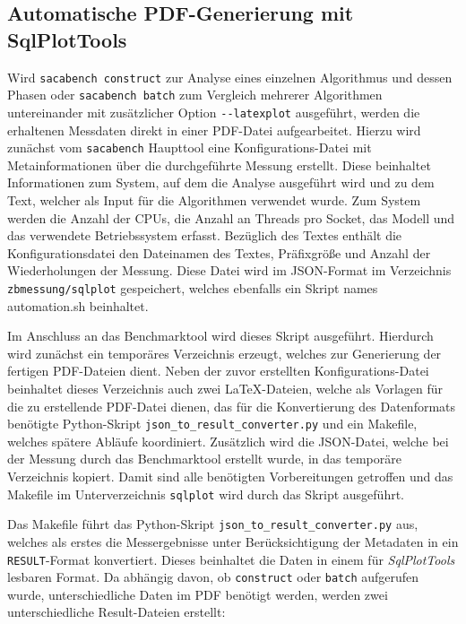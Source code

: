 \subsection{Automatische PDF-Generierung mit SqlPlotTools}
\label{framework:bechmark:sqlplottools}

Wird \texttt{sacabench construct} zur Analyse eines einzelnen Algorithmus und dessen Phasen oder \texttt{sacabench batch} zum Vergleich mehrerer Algorithmen untereinander mit zusätzlicher Option \texttt{-{}-latexplot} ausgeführt, werden die erhaltenen Messdaten direkt in einer PDF-Datei aufgearbeitet.
Hierzu wird zunächst vom \texttt{sacabench} Haupttool eine Konfigurations-Datei mit Metainformationen über die durchgeführte Messung erstellt.
Diese beinhaltet Informationen zum System, auf dem die Analyse ausgeführt wird und zu dem Text, welcher als Input für die Algorithmen verwendet wurde.
Zum System werden die Anzahl der CPUs, die Anzahl an Threads pro Socket, das Modell und das verwendete Betriebssystem erfasst.
Bezüglich des Textes enthält die Konfigurationsdatei den Dateinamen des Textes, Präfixgröße und Anzahl der Wiederholungen der Messung.
Diese Datei wird im JSON-Format im Verzeichnis \texttt{zbmessung/sqlplot} gespeichert, welches ebenfalls ein Skript names automation.sh beinhaltet.\par
Im Anschluss an das Benchmarktool wird dieses Skript ausgeführt.
Hierdurch wird zunächst ein temporäres Verzeichnis erzeugt, welches zur Generierung der fertigen PDF-Dateien dient.
Neben der zuvor erstellten Konfigurations-Datei beinhaltet dieses Verzeichnis auch zwei LaTeX-Dateien, welche als Vorlagen für die zu erstellende PDF-Datei dienen, das für die Konvertierung des Datenformats benötigte Python-Skript \texttt{json\_to\_result\_converter.py} und ein Makefile, welches spätere Abläufe koordiniert.
Zusätzlich wird die JSON-Datei, welche bei der Messung durch das Benchmarktool erstellt wurde, in das temporäre Verzeichnis kopiert.
Damit sind alle benötigten Vorbereitungen getroffen und das Makefile im Unterverzeichnis \texttt{sqlplot} wird durch das Skript ausgeführt.\par\smallskip
Das Makefile führt das Python-Skript \texttt{json\_to\_result\_converter.py} aus, welches als erstes die Messergebnisse unter Berücksichtigung der Metadaten in ein \texttt{RESULT}-Format konvertiert.
Dieses beinhaltet die Daten in einem für \emph{SqlPlotTools} \cite{sqlplottools} lesbaren Format.
Da abhängig davon, ob \texttt{construct} oder \texttt{batch} aufgerufen wurde, unterschiedliche Daten im PDF benötigt werden, werden zwei unterschiedliche Result-Dateien erstellt:
